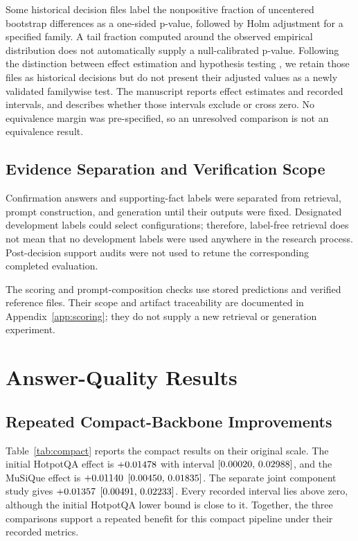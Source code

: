 \documentclass[11pt,a4paper]{article}
\begin{document}
Some historical decision files label the nonpositive fraction of uncentered
bootstrap differences as a one-sided p-value, followed by Holm adjustment for
a specified family. A tail fraction computed around the observed empirical
distribution does not automatically supply a null-calibrated p-value.
Following the distinction between effect estimation and hypothesis testing
\citep{dror2018hitchhiker}, we retain those files as historical decisions but
do not present their adjusted values as a newly validated familywise test.
The manuscript reports effect estimates and recorded intervals, and describes
whether those intervals exclude or cross zero. No equivalence margin was
pre-specified, so an unresolved comparison is not an equivalence result.

\subsection{Evidence Separation and Verification Scope}
Confirmation answers and supporting-fact labels were separated from retrieval,
prompt construction, and generation until their outputs were fixed.
Designated development labels could select configurations; therefore,
label-free retrieval does not mean that no development labels were used
anywhere in the research process. Post-decision support audits were not used
to retune the corresponding completed evaluation.

The scoring and prompt-composition checks use stored predictions and verified
reference files. Their scope and artifact traceability are documented in
Appendix~\ref{app:scoring}; they do not supply a new retrieval or generation
experiment.

\section{Answer-Quality Results}
\subsection{Repeated Compact-Backbone Improvements}
Table~\ref{tab:compact} reports the compact results on their original scale.
The initial HotpotQA effect is $+0.01478$ with interval $[0.00020,\,0.02988]$,
and the MuSiQue effect is $+0.01140$ $[0.00450,\,0.01835]$.
The separate joint component study gives $+0.01357$ $[0.00491,\,0.02233]$.
Every recorded interval lies above zero, although the initial HotpotQA
lower bound is close to it. Together, the three comparisons support a
repeated benefit for this compact pipeline under their recorded metrics.
\end{document}
